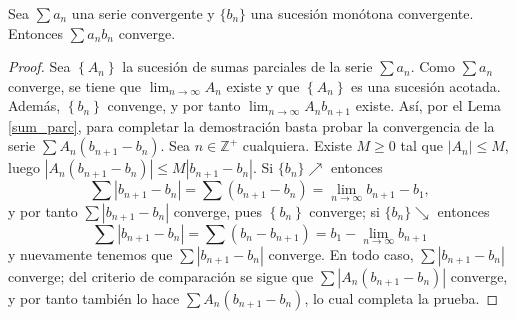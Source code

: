 \begin{theorem}
  Sea $\sum a_{n}$ una serie convergente y $\{b_n\}$ una sucesión monótona convergente. Entonces $\sum a_{n} b_{n}$ converge.
\end{theorem}
\begin{proof}
  Sea $\left\{A_{n}\right\}$ la sucesión de sumas parciales de la serie $\sum a_{n}$. Como $\sum a_{n}$ converge, se tiene que $\lim _{n \rightarrow \infty} A_{n}$ existe y que $\left\{A_{n}\right\}$ es una sucesión acotada. Además, $\left\{b_{n}\right\}$ convenge, y por tanto $\lim _{n \rightarrow \infty} A_{n} b_{n+1}$ existe. Así, por el Lema \ref{sum_parc}, para completar la demostración basta probar la convergencia de la serie $\sum A_{n}\left(b_{n+1}-b_{n}\right)$. Sea $n \in \mathbb{Z}^{+}$ cualquiera. Existe $M \geq 0$ tal que $\left|A_{n}\right| \leq M$, luego $\left|A_{n}\left(b_{n+1}-b_{n}\right)\right| \leq M\left|b_{n+1}-b_{n}\right|$. Si $\{ b_{n}\} \nearrow$ entonces 
  $$\sum\left|b_{n+1}-b_{n}\right|=\sum\left(b_{n+1}-b_{n}\right)=\lim _{n \rightarrow \infty} b_{n+1}-b_{1},$$
  y por tanto $\sum\left|b_{n+1}-b_{n}\right|$ converge, pues $\left\{b_{n}\right\}$ converge; si $\{b_n\}\searrow$ entonces 
  $$\sum\left|b_{n+1}-b_{n}\right|=\sum\left(b_{n}-b_{n+1}\right)=b_{1}-\lim _{n \rightarrow \infty} b_{n+1}$$ 
  y nuevamente tenemos que $\sum|b_{n+1}-b_{n}|$ converge. En todo caso, $\sum | b_{n+1}-b_{n} |$ converge; del criterio de comparación se sigue que $\sum\left|A_{n}\left(b_{n+1}-b_{n}\right)\right|$ converge, y por tanto también lo hace $\sum A_{n}\left(b_{n+1}-b_{n}\right)$, lo cual completa la prueba.
\end{proof}

